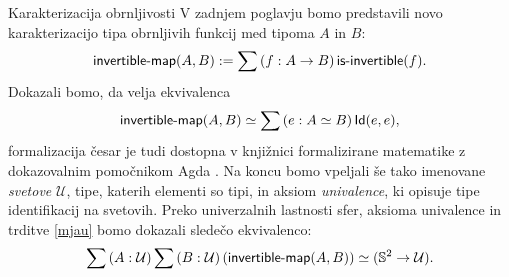 \documentclass[a4paper, slovene]{article}
\begin{document}
\begin{section}{Karakterizacija obrnljivosti}
  V zadnjem poglavju bomo predstavili novo karakterizacijo
  tipa obrnljivih funkcij med tipoma \(A\) in \(B\):
  \begin{equation}
    \label{mjau}
      \textnormal{\textsf{invertible-map}}(A, B) := \sum \left( f : A \to B \right) \textnormal{\textsf{is-invertible}}(f).
  \end{equation}
  Dokazali bomo, da velja ekvivalenca
  \[\textnormal{\textsf{invertible-map}}(A, B) \simeq \sum \left( e : A \simeq B \right) \textnormal{\textsf{Id}}(e, e),\]
  formalizacija česar je tudi dostopna v knjižnici formalizirane matematike z dokazovalnim
  pomočnikom Agda \cite{agda-unimath}.
  Na koncu bomo vpeljali še tako imenovane \emph{svetove} \(\mathcal{U}\), tipe, katerih elementi so
  tipi, in aksiom \emph{univalence}, ki opisuje tipe identifikacij na svetovih.
  Preko univerzalnih lastnosti sfer, aksioma univalence in trditve \ref{mjau}
  bomo dokazali sledečo ekvivalenco:
  \[\sum \left( A : \mathcal{U} \right) \sum \left( B : \mathcal{U} \right) (\textnormal{\textsf{invertible-map}}(A, B)) \simeq
    (\mathbb{S}^{2} \to \mathcal{U}).\]
\end{section}
\printbibliography
\end{document}
